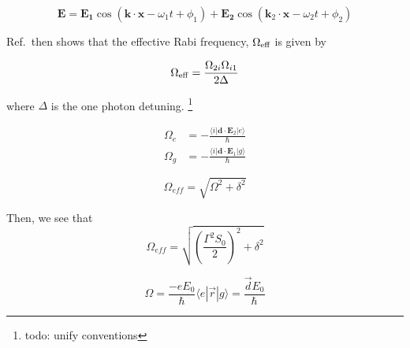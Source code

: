 \begin{equation}
\mathbf{E}=\mathbf{E_1} \cos(\mathbf{k}\cdot\mathbf{x} - \omega_1 t + \phi_1)
+\mathbf{E_2} \cos(\mathbf{k}_2\cdot\mathbf{x} - \omega_2 t + \phi_2)
\end{equation}

Ref.\,\cite{Young1997363} then shows that the effective Rabi frequency, $\Omega_{\textnormal{eff}}$ is given by 

\begin{equation}
\Omega_{\rm eff}=\frac{\Omega_{2i} \Omega_{i1}}{2 \Delta}
\end{equation}

where $\Delta$ is the one photon detuning. \footnote{todo: unify conventions} 

\begin{align}
\Omega_e&=-\frac{\langle i | \mathbf{d}\cdot \mathbf{E}_2 | e\rangle }{\hbar}\\
\Omega_g&=-\frac{\langle i | \mathbf{d}\cdot \mathbf{E}_1 | g\rangle}{\hbar}
\end{align}

\begin{equation}
\Omega_\mathit{eff}=\sqrt{\Omega^2+\delta^2}
\end{equation}

Then, we see that 
\begin{equation}
\Omega_\mathit{eff}=\sqrt{\left(\frac{\Gamma^2S_0}{2}\right)^2 + \delta^2}
\end{equation}

\begin{equation}
\Omega = \frac{-eE_0}{\hbar}\langle e |\vec{r}|g\rangle=\frac{\vec{d}E_0}{\hbar}
\end{equation}

%
%


%
%
%


